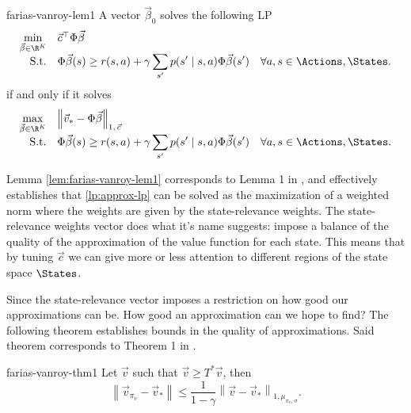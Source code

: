 \begin{lemma}{}{farias-vanroy-lem1}
    A vector $\vec{\beta}_0$ solves the following LP
    \[
    \begin{array}{rl@{}ll}
        \displaystyle \min_{\vec{\beta} \in \R^{K}} & \vec{c}^{\top} \Phi \vec{\beta} \\
        \text{S.t.} & \displaystyle \Phi \vec{\beta} (s) \geq r(s, a) + \gamma \sum_{s'} p(s' \mid s, a) \Phi \vec{\beta}(s') & \quad \forall a, s \in \Actions, \States . \\
    \end{array}
    \]
    if and only if it solves
    \[
    \begin{array}{rl@{}ll}
        \displaystyle \max_{\vec{\beta} \in \R^{K}} & \left\| \vec{v}_* - \Phi \vec{\beta} \right\|_{1, \, \vec{c}} \\
        \text{S.t.} & \displaystyle \Phi \vec{\beta} (s) \geq r(s, a) + \gamma \sum_{s'} p(s' \mid s, a) \Phi \vec{\beta}(s') & \quad \forall a, s \in \Actions, \States . \\
    \end{array}
    \]
\end{lemma}

Lemma \ref{lem:farias-vanroy-lem1} corresponds to Lemma 1 in
\Cite[pg.~853]{farias2003LP2ADP}, and effectively establishes that
\eqref{lp:approx-lp} can be solved as the maximization of a weighted norm where
the weights are given by the state-relevance weights. The state-relevance
weights vector does what it's name suggests: impose a balance of the quality of
the approximation of the value function for each state. This means that by
tuning $\vec{c}$ we can give more or less attention to different regions of the
state space $\States$.

Since the state-relevance vector imposes a restriction on how good our
approximations can be. How good an approximation can we hope to find? The
following theorem establishes bounds in the quality of approximations. Said
theorem corresponds to Theorem 1 in \Cite[pg.~853]{farias2003LP2ADP}.

\begin{thrm}{}{farias-vanroy-thm1}
    Let $\vec{v}$ such that $\vec{v} \geq T^{*} \vec{v}$, then
    \[
       \left\| \vec{v}_{\pi_v} - \vec{v}_* \right\| \leq \frac{1}{1 - \gamma} \left\| \vec{v}  - \vec{v}_* \right\|_{1, \mu_{\pi_v, \, \sigma}}.
    \]
\end{thrm}

